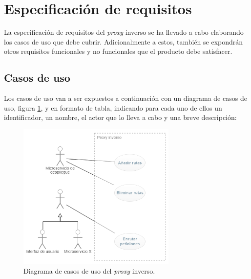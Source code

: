\documentclass[11pt,spanish,listoffigures]{tfgetsinf}
\begin{document}

	\section{Especificación de requisitos} \label{especificacionRequisitos}

La especificación de requisitos del \emph{proxy} inverso se ha llevado a cabo elaborando los casos de uso que debe cubrir. Adicionalmente a estos, también se expondrán otros requisitos funcionales y no funcionales que el producto debe satisfacer.


		\subsection{Casos de uso} \label{casosDeUso}

Los casos de uso van a ser expuestos a continuación con un diagrama de casos de uso, figura \ref{diagramaCasosDeUso}, y en formato de tabla, indicando para cada uno de ellos un identificador, un nombre, el actor que lo lleva a cabo y una breve descripción:

\begin{figure}[ht]
\centering
\includegraphics[width=0.70\textwidth]{imagenes/diagramaCasosDeUso}
\caption{Diagrama de casos de uso del \emph{proxy} inverso.}
	\label{diagramaCasosDeUso}
\end{figure}
\end{document}

